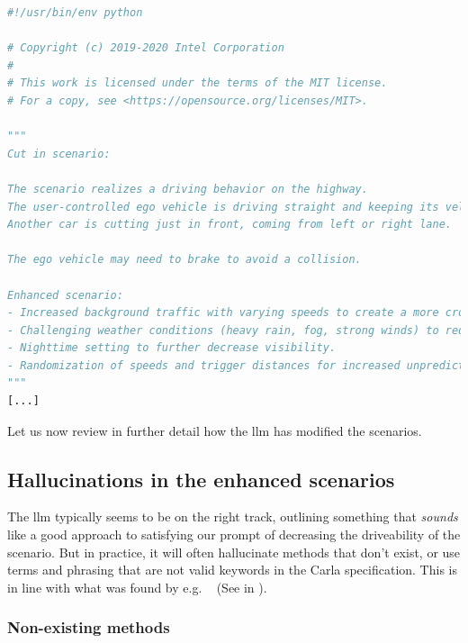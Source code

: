\begin{lstlisting}[caption={Head of an \acrshort{llm}-enhanced scenario, highlighting how the \acrshort{llm} can add an explenation of how it enhanced the scenario.}, label={lst:llmOutputExplenation}, language={Python}]
#!/usr/bin/env python

# Copyright (c) 2019-2020 Intel Corporation
#
# This work is licensed under the terms of the MIT license.
# For a copy, see <https://opensource.org/licenses/MIT>.

"""
Cut in scenario:

The scenario realizes a driving behavior on the highway.
The user-controlled ego vehicle is driving straight and keeping its velocity at a constant level.
Another car is cutting just in front, coming from left or right lane.

The ego vehicle may need to brake to avoid a collision.

Enhanced scenario:
- Increased background traffic with varying speeds to create a more crowded environment.
- Challenging weather conditions (heavy rain, fog, strong winds) to reduce visibility and grip.
- Nighttime setting to further decrease visibility.
- Randomization of speeds and trigger distances for increased unpredictability.
"""
[...]
\end{lstlisting}

Let us now review in further detail how the \acrshort{llm} has modified the scenarios.

\subsection{Hallucinations in the enhanced scenarios}\label{sec:resultsHallucinations}

The \acrshort{llm} typically seems to be on the right track, outlining something
that \emph{sounds} like a good approach to satisfying our prompt of decreasing
the driveability of the scenario. But in practice, it will often hallucinate
methods that don't exist, or use terms and phrasing that are not valid keywords
in the Carla specification. This is in line with what was found by e.g.
\citeauthor{autoSceneGen}~\cite[14542]{autoSceneGen} (See  in
).

\subsubsection{Non-existing methods}

